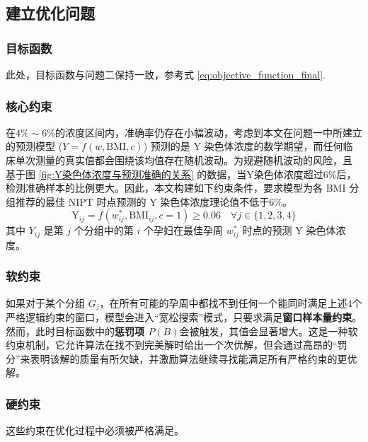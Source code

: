 \subsection{建立优化问题}

\subsubsection{目标函数}

此处，目标函数与问题二保持一致，参考式 \ref{eq:objective_function_final}.

\subsubsection{核心约束}

在$4\% \sim 6\%$的浓度区间内，准确率仍存在小幅波动，考虑到本文在问题一中所建立的预测模型 (\(Y = f(w, \text{BMI}, c)\)) 预测的是 Y 染色体浓度的数学期望，而任何临床单次测量的真实值都会围绕该均值存在随机波动。为规避随机波动的风险，且
基于图 \ref{fig:Y染色体浓度与预测准确的关系} 的数据，当Y染色体浓度超过$6\%$后，检测准确样本的比例更大。因此，本文构建如下约束条件，要求模型为各 BMI 分组推荐的最佳 NIPT 时点预测的 Y 染色体浓度理论值不低于$6\%$。
\begin{equation}
    \text{Y}_{ij} = f(w_{ij}^*, \text{BMI}_{ij}, c=1) \ge 0.06 \quad \forall j \in \{1, 2, 3, 4\}
    \label{eq:constraint_y_gt_6_percent}
\end{equation}
其中 $Y_{ij}$ 是第 $j$ 个分组中的第 $i$ 个孕妇在最佳孕周 $w_{ij}^*$ 时点的预测 Y 染色体浓度。

\subsubsection{软约束}

如果对于某个分组 $G_j$，在所有可能的孕周中都找不到任何一个能同时满足上述4个严格逻辑约束的窗口，模型会进入“宽松搜索”模式，只要求满足\textbf{窗口样本量约束}。然而，此时目标函数中的\textbf{惩罚项 $P(B)$}会被触发，其值会显著增大。这是一种软约束机制，它允许算法在找不到完美解时给出一个次优解，但会通过高昂的“罚分”来表明该解的质量有所欠缺，并激励算法继续寻找能满足所有严格约束的更优解。

\subsubsection{硬约束}

这些约束在优化过程中必须被严格满足。

